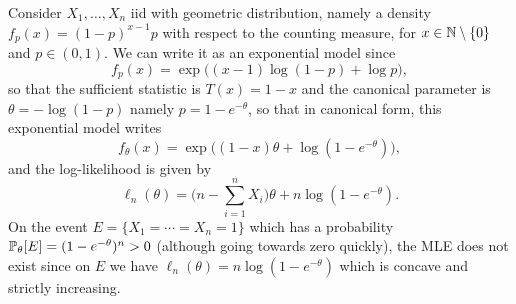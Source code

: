 \begin{remark}
  Consider $X_1, \ldots, X_n$ iid with geometric distribution, namely a density $f_p(x) = (1 - p)^{x-1} p$ with respect to the counting measure, for $x \in \N \setminus \{ 0 \}$ and $p \in (0, 1)$. We can write it as an exponential model since
  \begin{equation*}
    f_p(x) = \exp\big( (x - 1) \log(1 - p) + \log p \big),
  \end{equation*}
  so that the sufficient statistic is $T(x) = 1 - x$ and the canonical parameter is $\theta = - \log(1 - p)$ namely $p = 1 - e^{-\theta}$, so that in canonical form, this exponential model writes
  \begin{equation*}
      f_\theta(x) = \exp \big( (1 - x) \theta  + \log(1 - e^{-\theta}) \big),
  \end{equation*}
  and the log-likelihood is given by
  \begin{equation*}
      \ell_n(\theta) = \Big(n - \sum_{i=1}^n X_i \Big) \theta + n \log(1 - e^{-\theta}).
  \end{equation*}
  On the event $E = \{ X_1 = \cdots = X_n = 1 \}$ which has a probability $\P_\theta[E] = (1 - e^{-\theta})^n > 0$ (although going towards zero quickly), the MLE does not exist since on $E$ we have $\ell_n(\theta) = n \log(1 - e^{-\theta})$ which is concave and strictly increasing.
\end{remark}


